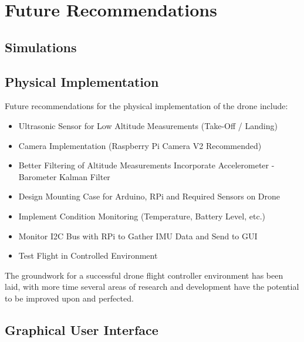 \section{Future Recommendations}
\subsection{Simulations}


\subsection{Physical Implementation}

Future recommendations for the physical implementation of the drone include:

\begin{itemize}
\item Ultrasonic Sensor for Low Altitude Measurements (Take-Off / Landing)
\item Camera Implementation (Raspberry Pi Camera V2 Recommended)
\item Better Filtering of Altitude Measurements Incorporate Accelerometer - Barometer Kalman Filter
\item Design Mounting Case for Arduino, RPi and Required Sensors on Drone
\item Implement Condition Monitoring (Temperature, Battery Level, etc.)
\item Monitor I2C Bus with RPi to Gather IMU Data and Send to GUI
\item Test Flight in Controlled Environment
\end{itemize}

The groundwork for a successful drone flight controller environment has been laid, with more time several areas of research and development have the potential to be improved upon and perfected.


\subsection{Graphical User Interface}

